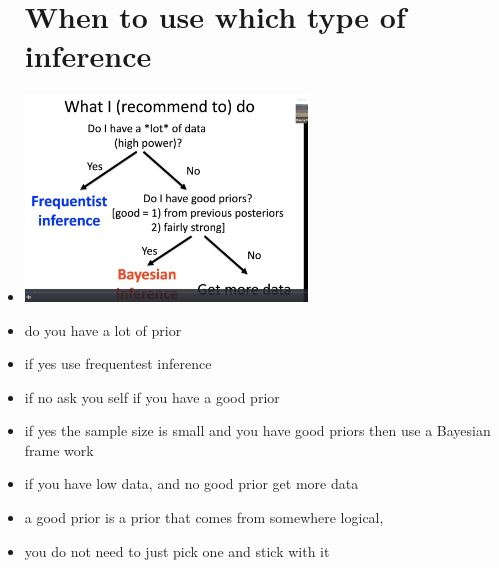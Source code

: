 \documentclass{article}
\begin{document}
\begin{itemize}
\section{When to use which type of inference}
\item \includegraphics[width=7.5cm]{Final_Review/lecture_6/inference_flow_chart.jpg}

\item  do you have a lot of prior 
\item if yes use frequentest inference 
\item if no ask you self if you have a good prior 
\item if yes the sample size is small and you have good priors then use a Bayesian frame work
\item if you have low data, and no good prior get more data
\item a good prior is a prior that comes from somewhere logical, 
\item you do not need to just pick one and stick with it 


\end{itemize}
\end{document}
